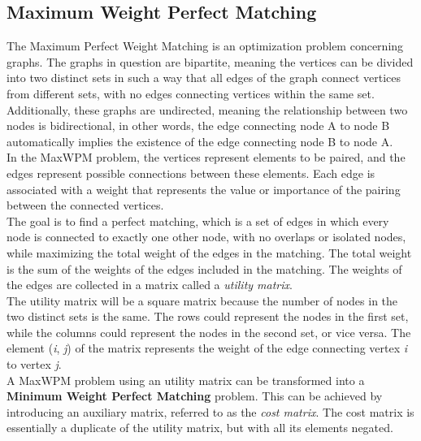 \subsection{Maximum Weight Perfect Matching}
\label{sec:MaxWPM}
The Maximum Perfect Weight Matching is an optimization problem concerning graphs.
The graphs in question are bipartite, meaning the vertices can be divided into two distinct sets in such a way that all edges of the graph connect vertices from different sets, with no edges connecting vertices within the same set.
Additionally, these graphs are undirected, meaning the relationship between two nodes is bidirectional, in other words, the edge connecting node A to node B automatically implies the existence of the edge connecting node B to node A. \\
In the MaxWPM problem, the vertices represent elements to be paired, and the edges represent possible connections between these elements. 
Each edge is associated with a weight that represents the value or importance of the pairing between the connected vertices.\\
The goal is to find a perfect matching, which is a set of edges in which every node is connected to exactly one other node, with no overlaps or isolated nodes, while maximizing the total weight of the edges in the matching.
The total weight is the sum of the weights of the edges included in the matching.
The weights of the edges are collected in a matrix called a \textit{utility matrix}.\\
The utility matrix will be a square matrix because the number of nodes in the two distinct sets is the same.
The rows could represent the nodes in the first set, while the columns could represent the nodes in the second set, or vice versa.
The element (\textit{i}, \textit{j}) of the matrix represents the weight of the edge connecting vertex \textit{i} to vertex \textit{j}. \\

A MaxWPM problem using an utility matrix can be transformed into a \textbf{Minimum Weight Perfect Matching} problem.
This can be achieved by introducing an auxiliary matrix, referred to as the \textit{cost matrix}.
The cost matrix is essentially a duplicate of the utility matrix, but with all its elements negated.

